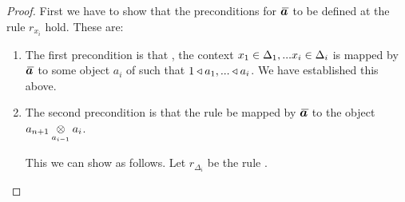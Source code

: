 \begin{proof}
First we have to show that the preconditions for $\Ibar$ to be defined at the rule $r_{x_i}$ hold. These are:

\begin{enumerate}
\item The first precondition is that \foreachi[n+1], the context $\xDelta{i}$ is mapped by $\Ibar$ to some object $a_i$ of \catcw such
that $1 \base a_1,...\base a_i$. We have established this above. 

\item The second precondition is that the rule  be mapped by $\Ibar$ to the object $\crossx{a_{n+1}}{a_i}{a_{i-1}}$.

This we can show as follows.
\newcommand{\deltaimapped}{\crossx{a_{n+1}}{a_i}{a_{i-1}}}
\newcommand{\deltaimappedlong}{s(p_{a_{n+1},a_{i-1}})^*...s(p_{a_{n+1},a_1})^*(\crossx{a_{n+1}}{a_i}{1})}
Let $r_{\Delta_i}$ be the rule .



\end{enumerate}
\end{proof}
